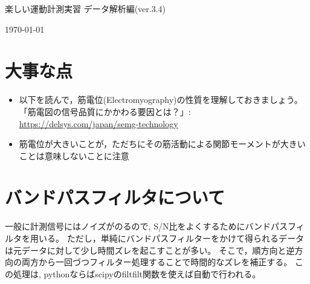 \documentclass{ltjsarticle}
\def\version{3.4}
\begin{document}
\begin{center}
  {\LARGE 楽しい運動計測実習 データ解析編(ver.\version)}
\end{center}
\begin{flushright}
\today
\end{flushright}


\section{大事な点}

\begin{itemize}
\item  以下を読んで，筋電位(Electromyography)の性質を理解しておきましょう。\\
  「筋電図の信号品質にかかわる要因とは？」: \url{https://delsys.com/japan/semg-technology}
\item 筋電位が大きいことが，ただちにその筋活動による関節モーメントが大きいことは意味しないことに注意
\end{itemize}



\section{バンドパスフィルタについて}  
一般に計測信号にはノイズがのるので, S/N比をよくするためにバンドパスフィルタを用いる。
ただし，単純にバンドパスフィルターをかけて得られるデータは元データに対して少し時間ズレを起こすことが多い。
そこで，順方向と逆方向の両方から一回づつフィルター処理することで時間的なズレを補正する。
この処理は, pythonならばscipyのfiltfilt関数を使えば自動で行われる。
\end{document}
